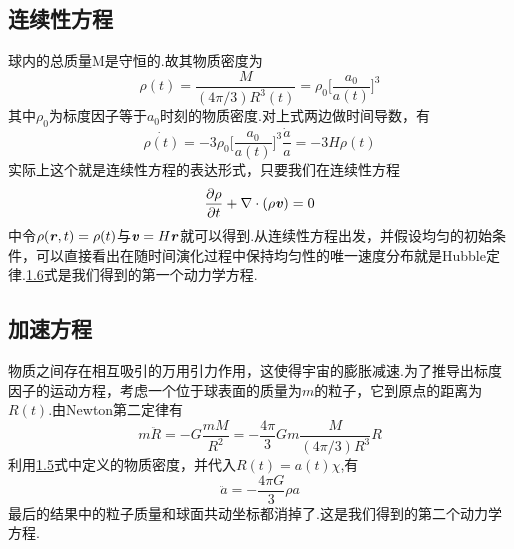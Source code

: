 \documentclass[a4paper]{book}
\newcommand{\xtjc}[1]{\textbf{\textit{#1}}}
\begin{document}
\subsection{连续性方程}
球内的总质量M是守恒的.故其物质密度为
\begin{equation}
	\rho(t)=\frac{M}{(4\pi/3)R^3(t)}=\rho_{0}\Big[\frac{a_0}{a(t)}\Big]^3
\end{equation}
其中$\rho_{0}$为标度因子等于$a_0$时刻的物质密度.对上式两边做时间导数，有
\begin{equation}\label{1.6}
	\dot{\rho(t)}=-3\rho_{0}\Big[\frac{a_0}{a(t)}\Big]^3\frac{\dot{a}}{a}=-3H\rho(t)
\end{equation}
实际上这个就是连续性方程的表达形式，只要我们在连续性方程
\begin{equation}
	\frac{\partial\rho}{\partial t}+\nabla\cdot(\rho\xtjc{v})=0
\end{equation}
中令$\rho(\xtjc{r},t)=\rho(t)$与$\xtjc{v}=H\xtjc{r}$就可以得到.从连续性方程出发，并假设均匀的初始条件，可以直接看出在随时间演化过程中保持均匀性的唯一速度分布就是Hubble定律.\hyperref[1.6]{1.6}式是我们得到的第一个动力学方程.\par 
\subsection{加速方程}
物质之间存在相互吸引的万用引力作用，这使得宇宙的膨胀减速.为了推导出标度因子的运动方程，考虑一个位于球表面的质量为$m$的粒子，它到原点的距离为$R(t)$.由Newton第二定律有
\begin{equation}
	m\ddot{R}=-G\frac{mM}{R^2}=-\frac{4\pi}{3}Gm\frac{M}{(4\pi/3)R^3}R
\end{equation}
利用\hyperref[1.5]{1.5}式中定义的物质密度，并代入$R(t)=a(t)\chi$,有
\begin{equation}
	\ddot{a}=-\frac{4\pi G}{3}\rho a
\end{equation}
最后的结果中的粒子质量和球面共动坐标都消掉了.这是我们得到的第二个动力学方程.
\end{document}
